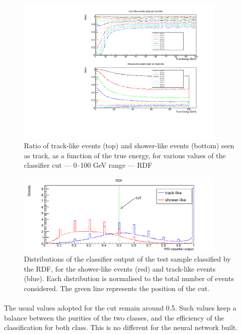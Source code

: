 \begin{figure}[!h]
    \centering
    \includegraphics[width=0.9\textwidth]{fig/Cuts_comparison.pdf}
    \caption{Ratio of track-like events (top) and shower-like events (bottom) seen as track, as a function of the true energy, for various values of the classifier cut --- 0--100 GeV range --- RDF}
    \label{fig:JHYD}
\end{figure}

\begin{figure}[!h]
    \centering
    \includegraphics[width=0.9\textwidth]{fig/PID_Classifier_RDF_E_cut_100.pdf}
    \caption{Distributions of the classifier output of the test sample classified by the RDF, for the shower-like events (red) and track-like events (blue). Each distribution is normalised to the total number of events considered. The green line represents the position of the cut.}
    \label{fig:ABHD}
\end{figure}

\paragraph{}
The usual values adopted for the cut remain around 0.5. Such values keep a balance between the purities of the two classes, and the efficiency of the classification for both class. This is no different for the neural network built.

